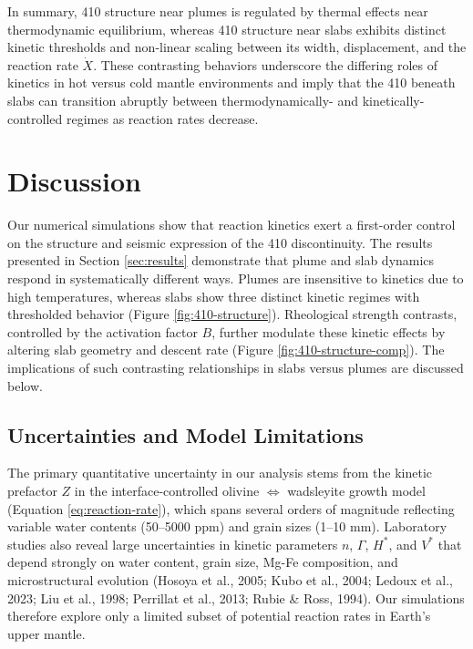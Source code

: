 \documentclass[draft,linenumbers]{agujournal2019}
\begin{document}
In summary, 410 structure near plumes is regulated by thermal effects
near thermodynamic equilibrium, whereas 410 structure near slabs
exhibits distinct kinetic thresholds and non-linear scaling between its
width, displacement, and the reaction rate \(\dot{X}\). These
contrasting behaviors underscore the differing roles of kinetics in hot
versus cold mantle environments and imply that the 410 beneath slabs can
transition abruptly between thermodynamically- and
kinetically-controlled regimes as reaction rates decrease.

\section{Discussion}\label{sec:discussion}

Our numerical simulations show that reaction kinetics exert a
first-order control on the structure and seismic expression of the 410
discontinuity. The results presented in Section \ref{sec:results}
demonstrate that plume and slab dynamics respond in systematically
different ways. Plumes are insensitive to kinetics due to high
temperatures, whereas slabs show three distinct kinetic regimes with
thresholded behavior (Figure \ref{fig:410-structure}). Rheological
strength contrasts, controlled by the activation factor \(B\), further
modulate these kinetic effects by altering slab geometry and descent
rate (Figure \ref{fig:410-structure-comp}). The implications of such
contrasting relationships in slabs versus plumes are discussed below.

\subsection{Uncertainties and Model
Limitations}\label{sec:uncertainties-and-model-limitations}

The primary quantitative uncertainty in our analysis stems from the
kinetic prefactor \(Z\) in the interface-controlled olivine
\(\Leftrightarrow\) wadsleyite growth model (Equation
\ref{eq:reaction-rate}), which spans several orders of magnitude
reflecting variable water contents (50--5000 ppm) and grain sizes (1--10
mm). Laboratory studies also reveal large uncertainties in kinetic
parameters \(n\), \(\Gamma\), \(H^{\ast}\), and \(V^{\ast}\) that depend
strongly on water content, grain size, Mg-Fe composition, and
microstructural evolution (Hosoya et al., 2005; Kubo et al., 2004;
{Ledoux et al.}, 2023; Liu et al., 1998; Perrillat et al., 2013; Rubie
\& Ross, 1994). Our simulations therefore explore only a limited subset
of potential reaction rates in Earth's upper mantle.
\end{document}
